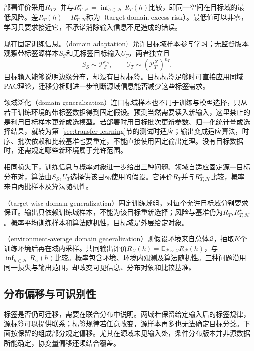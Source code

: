 部署评价采用$R_T$，并与$R_{T,\mathcal H}^{\star}=\inf_{h\in\mathcal H}R_T(h)$比较，即同一空间在目标域的最低风险。差$R_T(h)-R_{T,\mathcal H}^{\star}$称为（target-domain excess risk）。最低值可以非零，学习只要求接近它，不承诺消除输入信息不足造成的错误。

现在固定训练信息。（domain adaptation）允许目标域样本参与学习；无监督版本观察带标签源样本$S_S$和无标签目标输入$U_T$，两者独立且
\[
 S_S\sim\mathcal P_S^{n_S},\qquad
 U_T\sim(\mathcal P_T^X)^{n_T}.
\]
目标输入能够说明边缘分布，却没有目标标签。目标标签足够时可直接应用同域PAC理论，迁移分析则进一步判断源域信息能否减少这些标签需求。

领域泛化（domain generalization）连目标域样本也不用于训练与模型选择，只从若干训练环境的带标签数据得到固定假设。预测当然需要读入新输入，这里禁止的是利用目标样本更新或选模型。若部署时用目标批次更新参数、归一化统计量或选择结果，就转为第~\ref{sec:transfer-learning}节的测试时适应；输出变成适应算法，时序、批次依赖和比较基准也要重定，不能直接使用固定输出定理。没有目标数据时，还需规定哪些新环境属于允许范围。

相同损失下，训练信息与概率对象进一步给出三种问题。领域自适应固定源—目标分布对，算法由$S_S,U_T$选择供该目标使用的假设。它评价$R_T$并与$R_{T,\mathcal H}^{\star}$比较，概率来自两批样本及算法随机性。

（target-wise domain generalization）固定训练域组，对每个允许目标域分别要求保证。输出只依赖训练域样本，不能为该目标重新选择；风险与基准仍为$R_T,R_{T,\mathcal H}^{\star}$。概率平均训练样本和算法随机性，目标域是外层给定对象。

（environment-average domain generalization）则假设环境来自总体$\mathcal Q$，抽取$K$个训练环境后再在域内采样。共同输出评价$R_{\mathcal Q}(h)=\mathbb E_{\mathcal P\sim\mathcal Q}R_{\mathcal P}(h)$，与$\inf_{h\in\mathcal H}R_{\mathcal Q}(h)$比较。概率包含环境、环境内观测及算法随机性。三种问题沿用同一损失与输出范围，却改变可见信息、分布对象和比较基准。

\subsection{分布偏移与可识别性}
\label{sec:distribution-shift}

标签是否仍可迁移，需要在联合分布中说明。两域若保留给定输入后的标签规律，源标签可以提供联系；标签规律若任意改变，源样本再多也无法确定目标分类。下面按保留的组成部分规定偏移。尤其在源域未见输入处，条件分布版本并非源数据所能确定，协变量偏移还须结合覆盖。

